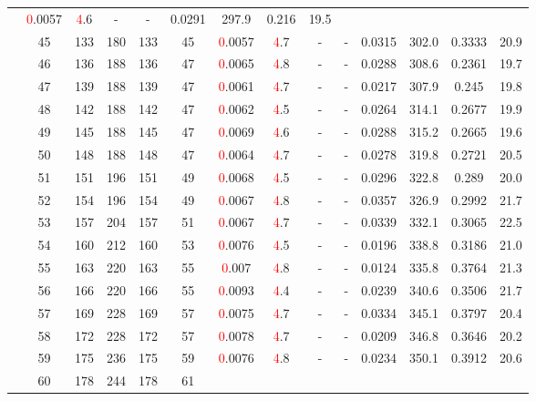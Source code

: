 \begin{table}[htb]
{\begin{tabular}{|c|c|c|c|c|c|c|c|c|c|c|c|c|c|}
 & \textcolor{red}0.0057 & \textcolor{red}4.6
 & - & -
 & 0.0291 & 297.9
 & 0.216 & 19.5
 \\
 & 
45 & 133 & 180 & 133 & 45
 & \textcolor{red}0.0057 & \textcolor{red}4.7
 & - & -
 & 0.0315 & 302.0
 & 0.3333 & 20.9
 \\
 & 
46 & 136 & 188 & 136 & 47
 & \textcolor{red}0.0065 & \textcolor{red}4.8
 & - & -
 & 0.0288 & 308.6
 & 0.2361 & 19.7
 \\
 & 
47 & 139 & 188 & 139 & 47
 & \textcolor{red}0.0061 & \textcolor{red}4.7
 & - & -
 & 0.0217 & 307.9
 & 0.245 & 19.8
 \\
 & 
48 & 142 & 188 & 142 & 47
 & \textcolor{red}0.0062 & \textcolor{red}4.5
 & - & -
 & 0.0264 & 314.1
 & 0.2677 & 19.9
 \\
 & 
49 & 145 & 188 & 145 & 47
 & \textcolor{red}0.0069 & \textcolor{red}4.6
 & - & -
 & 0.0288 & 315.2
 & 0.2665 & 19.6
 \\
 & 
50 & 148 & 188 & 148 & 47
 & \textcolor{red}0.0064 & \textcolor{red}4.7
 & - & -
 & 0.0278 & 319.8
 & 0.2721 & 20.5
 \\
 & 
51 & 151 & 196 & 151 & 49
 & \textcolor{red}0.0068 & \textcolor{red}4.5
 & - & -
 & 0.0296 & 322.8
 & 0.289 & 20.0
 \\
 & 
52 & 154 & 196 & 154 & 49
 & \textcolor{red}0.0067 & \textcolor{red}4.8
 & - & -
 & 0.0357 & 326.9
 & 0.2992 & 21.7
 \\
 & 
53 & 157 & 204 & 157 & 51
 & \textcolor{red}0.0067 & \textcolor{red}4.7
 & - & -
 & 0.0339 & 332.1
 & 0.3065 & 22.5
 \\
 & 
54 & 160 & 212 & 160 & 53
 & \textcolor{red}0.0076 & \textcolor{red}4.5
 & - & -
 & 0.0196 & 338.8
 & 0.3186 & 21.0
 \\
 & 
55 & 163 & 220 & 163 & 55
 & \textcolor{red}0.007 & \textcolor{red}4.8
 & - & -
 & 0.0124 & 335.8
 & 0.3764 & 21.3
 \\
 & 
56 & 166 & 220 & 166 & 55
 & \textcolor{red}0.0093 & \textcolor{red}4.4
 & - & -
 & 0.0239 & 340.6
 & 0.3506 & 21.7
 \\
 & 
57 & 169 & 228 & 169 & 57
 & \textcolor{red}0.0075 & \textcolor{red}4.7
 & - & -
 & 0.0334 & 345.1
 & 0.3797 & 20.4
 \\
 & 
58 & 172 & 228 & 172 & 57
 & \textcolor{red}0.0078 & \textcolor{red}4.7
 & - & -
 & 0.0209 & 346.8
 & 0.3646 & 20.2
 \\
 & 
59 & 175 & 236 & 175 & 59
 & \textcolor{red}0.0076 & \textcolor{red}4.8
 & - & -
 & 0.0234 & 350.1
 & 0.3912 & 20.6
 \\
 & 
60 & 178 & 244 & 178 & 61

\end{tabular}}
\end{table}

